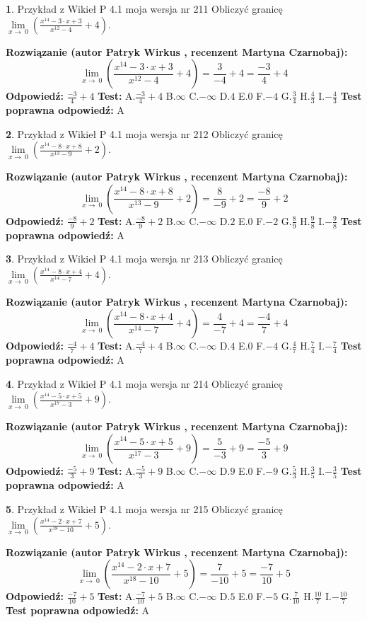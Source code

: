 \documentclass[12pt, a4paper]{article}
\theoremstyle{definition} %
\newtheorem{zad}{}
\newcommand{\zadStart}[1]{\begin{zad}#1\newline}
\newcommand{\zadStop}{\end{zad}}
\newcommand{\rozwStart}[2]{\noindent \textbf{Rozwiązanie (autor #1 , recenzent #2): }\newline}
\newcommand{\rozwStop}{\newline}
\newcommand{\odpStart}{\noindent \textbf{Odpowiedź:}\newline}
\newcommand{\odpStop}{\newline}
\newcommand{\testStart}{\noindent \textbf{Test:}\newline}
\newcommand{\testStop}{\newline}
\newcommand{\kluczStart}{\noindent \textbf{Test poprawna odpowiedź:}\newline}
\newcommand{\kluczStop}{\newline}
\begin{document}
\zadStart{Przykład z Wikieł P 4.1 moja wersja nr 211}
Obliczyć granicę $\lim\limits_{x\to\ 0}(\frac{x^{14}-3 \cdot x +3}{x^{12}-4}+4)$.
\zadStop
\rozwStart{Patryk Wirkus}{Martyna Czarnobaj}
$$\lim\limits_{x\to\ 0}(\frac{x^{14}-3 \cdot x +3}{x^{12}-4}+4)=\frac{3}{-4}+4=\frac{-3}{4}+4$$
\rozwStop
\odpStart
$\frac{-3}{4}+4$
\odpStop
\testStart
A.$\frac{-3}{4}+4$
B.$\infty$
C.$-\infty$
D.$4$
E.$0$
F.$-4$
G.$\frac{3}{4}$
H.$\frac{4}{3}$
I.$-\frac{4}{3}$
\testStop
\kluczStart
A
\kluczStop



\zadStart{Przykład z Wikieł P 4.1 moja wersja nr 212}
Obliczyć granicę $\lim\limits_{x\to\ 0}(\frac{x^{14}-8 \cdot x +8}{x^{13}-9}+2)$.
\zadStop
\rozwStart{Patryk Wirkus}{Martyna Czarnobaj}
$$\lim\limits_{x\to\ 0}(\frac{x^{14}-8 \cdot x +8}{x^{13}-9}+2)=\frac{8}{-9}+2=\frac{-8}{9}+2$$
\rozwStop
\odpStart
$\frac{-8}{9}+2$
\odpStop
\testStart
A.$\frac{-8}{9}+2$
B.$\infty$
C.$-\infty$
D.$2$
E.$0$
F.$-2$
G.$\frac{8}{9}$
H.$\frac{9}{8}$
I.$-\frac{9}{8}$
\testStop
\kluczStart
A
\kluczStop



\zadStart{Przykład z Wikieł P 4.1 moja wersja nr 213}
Obliczyć granicę $\lim\limits_{x\to\ 0}(\frac{x^{14}-8 \cdot x +4}{x^{14}-7}+4)$.
\zadStop
\rozwStart{Patryk Wirkus}{Martyna Czarnobaj}
$$\lim\limits_{x\to\ 0}(\frac{x^{14}-8 \cdot x +4}{x^{14}-7}+4)=\frac{4}{-7}+4=\frac{-4}{7}+4$$
\rozwStop
\odpStart
$\frac{-4}{7}+4$
\odpStop
\testStart
A.$\frac{-4}{7}+4$
B.$\infty$
C.$-\infty$
D.$4$
E.$0$
F.$-4$
G.$\frac{4}{7}$
H.$\frac{7}{4}$
I.$-\frac{7}{4}$
\testStop
\kluczStart
A
\kluczStop



\zadStart{Przykład z Wikieł P 4.1 moja wersja nr 214}
Obliczyć granicę $\lim\limits_{x\to\ 0}(\frac{x^{14}-5 \cdot x +5}{x^{17}-3}+9)$.
\zadStop
\rozwStart{Patryk Wirkus}{Martyna Czarnobaj}
$$\lim\limits_{x\to\ 0}(\frac{x^{14}-5 \cdot x +5}{x^{17}-3}+9)=\frac{5}{-3}+9=\frac{-5}{3}+9$$
\rozwStop
\odpStart
$\frac{-5}{3}+9$
\odpStop
\testStart
A.$\frac{-5}{3}+9$
B.$\infty$
C.$-\infty$
D.$9$
E.$0$
F.$-9$
G.$\frac{5}{3}$
H.$\frac{3}{5}$
I.$-\frac{3}{5}$
\testStop
\kluczStart
A
\kluczStop



\zadStart{Przykład z Wikieł P 4.1 moja wersja nr 215}
Obliczyć granicę $\lim\limits_{x\to\ 0}(\frac{x^{14}-2 \cdot x +7}{x^{18}-10}+5)$.
\zadStop
\rozwStart{Patryk Wirkus}{Martyna Czarnobaj}
$$\lim\limits_{x\to\ 0}(\frac{x^{14}-2 \cdot x +7}{x^{18}-10}+5)=\frac{7}{-10}+5=\frac{-7}{10}+5$$
\rozwStop
\odpStart
$\frac{-7}{10}+5$
\odpStop
\testStart
A.$\frac{-7}{10}+5$
B.$\infty$
C.$-\infty$
D.$5$
E.$0$
F.$-5$
G.$\frac{7}{10}$
H.$\frac{10}{7}$
I.$-\frac{10}{7}$
\testStop
\kluczStart
A
\kluczStop
\end{document}
